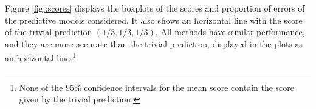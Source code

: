 \documentclass[journal,article,accept,moreauthors,pdftex,12pt,a4paper]{mdpi}
\begin{document}




%


Figure \ref{fig::scores} displays the boxplots of the scores and proportion of errors of the predictive models considered.
It also shows an horizontal line with the score of the trivial prediction $(1/3,1/3,1/3)$. 
All methods have similar performance, and they are more accurate than the trivial prediction, displayed in the plots
as an horizontal line.\footnote{None of the 95\% confidence intervals for the mean score contain the score given by the trivial prediction.}
\end{document}
